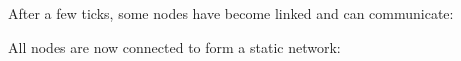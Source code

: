 \documentclass{article}
\begin{document}
After a few ticks, some nodes have become linked and can communicate:

All nodes are now connected to form a static network:
\end{document}
